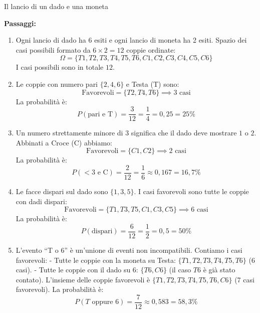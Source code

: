 \begin{esercizio}{Il lancio di un dado e una moneta}
\begin{soluzione}
  \textbf{Passaggi:}
  \begin{enumerate}[label=\alph*)]
    \item Ogni lancio di dado ha 6 esiti e ogni lancio di moneta ha 2 esiti. Spazio dei casi possibili formato da $6 \times 2 = 12$ coppie ordinate:
    \[
    \Omega = \{T1, T2, T3, T4, T5, T6, C1, C2, C3, C4, C5, C6\}
    \]
    I casi possibili sono in totale $12$.
    \item Le coppie con numero pari $\{2,4,6\}$ e Testa (T) sono:
    \[
    \text{Favorevoli} = \{T2, T4, T6\} \implies 3 \text{ casi}
    \]
    La probabilità è:
    \[
    P(\text{pari e T}) = \frac{3}{12} = \frac{1}{4} = 0{,}25 = 25\%
    \]
    \item Un numero strettamente minore di $3$ significa che il dado deve mostrare $1$ o $2$. Abbinati a Croce (C) abbiamo:
    \[
    \text{Favorevoli} = \{C1, C2\} \implies 2 \text{ casi}
    \]
    La probabilità è:
    \[
    P(< 3 \text{ e C}) = \frac{2}{12} = \frac{1}{6} \approx 0{,}167 = 16{,}7\%
    \]
    \item Le facce dispari sul dado sono $\{1,3,5\}$. I casi favorevoli sono tutte le coppie con dadi dispari:
    \[
    \text{Favorevoli} = \{T1, T3, T5, C1, C3, C5\} \implies 6 \text{ casi}
    \]
    La probabilità è:
    \[
    P(\text{dispari}) = \frac{6}{12} = \frac{1}{2} = 0{,}5 = 50\%
    \]
    \item L'evento ``T o 6'' è un'unione di eventi non incompatibili. Contiamo i casi favorevoli:
    - Tutte le coppie con la moneta su Testa: $\{T1, T2, T3, T4, T5, T6\}$ (6 casi).
    - Tutte le coppie con il dado su 6: $\{T6, C6\}$ (il caso $T6$ è già stato contato).
    L'insieme delle coppie favorevoli è $\{T1, T2, T3, T4, T5, T6, C6\}$ (7 casi favorevoli).
    La probabilità è:
    \[
    P(T \text{ oppure } 6) = \frac{7}{12} \approx 0{,}583 = 58{,}3\%
    \]
  \end{enumerate}
\end{soluzione}
\end{esercizio}

\condnewpage

